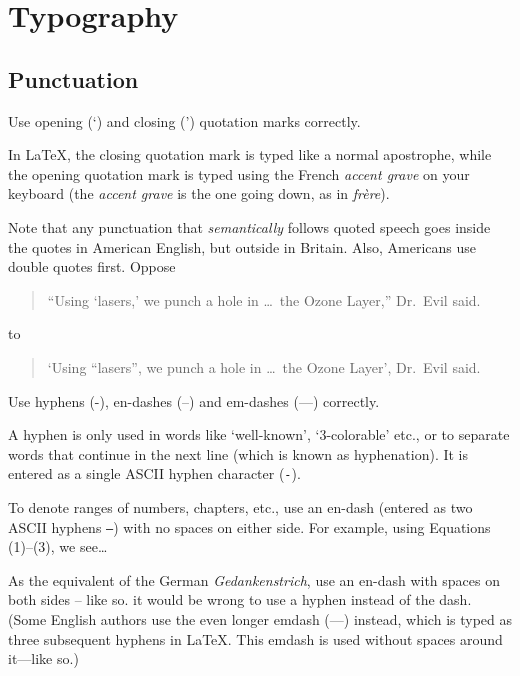 \chapter{Typography }


\section{Punctuation}

\begin{Rule}
  Use opening (`) and closing (') quotation marks correctly.
\end{Rule}

In \LaTeX, the closing quotation mark is typed like a normal
apostrophe, while the opening quotation mark is typed using the French
\emph{accent grave} on your keyboard (the \emph{accent grave} is the
one going down, as in \emph{frère}).

Note that any punctuation that \emph{semantically} follows quoted
speech goes inside the quotes in American English, but outside in
Britain.  Also, Americans use double quotes first.  Oppose
\begin{quote}
  ``Using `lasers,' we punch a hole in \ldots\ the Ozone Layer,''
  Dr.\ Evil said.
\end{quote}
to
\begin{quote}
  `Using ``lasers'', we punch a hole in \ldots\ the Ozone Layer',
  Dr.\ Evil said.
\end{quote}

\begin{Rule}
  Use hyphens (-), en-dashes (--) and em-dashes (---) correctly.
\end{Rule}

A hyphen is only used in words like `well-known', `$3$-colorable'
etc., or to separate words that continue in the next line (which is
known as hyphenation).  It is entered as a single ASCII hyphen
character (\texttt{-}).

To denote ranges of numbers, chapters, etc., use an en-dash (entered
as two ASCII hyphens \texttt{--}) with no spaces on either side.  For
example, using Equations (1)--(3), we see\ldots

As the equivalent of the German \emph{Gedankenstrich}, use an en-dash
with spaces on both sides -- like so.
it would be wrong to use a hyphen instead of the dash. (Some English
authors use the even longer emdash (---) instead, which is typed as
three subsequent hyphens in \LaTeX. This emdash is used without spaces
around it---like so.)


